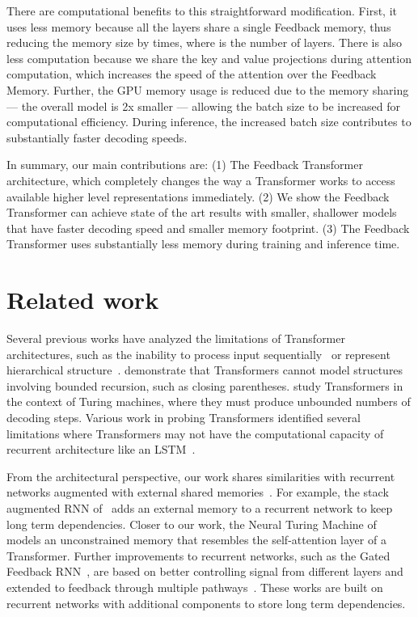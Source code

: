 \documentclass{article} \usepackage{iclr2021_conference}
\begin{document}
There are computational benefits to this straightforward modification. First, it uses less memory because all the layers share a single Feedback memory, thus reducing the memory size by  times, where  is the number of layers. There is also less computation because we share the key and value projections during attention computation, which increases the speed of the attention over the Feedback Memory.
Further, the GPU memory usage is reduced due to the memory sharing --- the overall model is 2x smaller --- allowing the batch size to be increased for computational efficiency. During inference, the increased batch size contributes to substantially faster decoding speeds. 

In summary, our main contributions are: (1) The Feedback Transformer architecture, which completely changes the way a Transformer works to access available higher level representations immediately. (2) We show the Feedback Transformer can achieve state of the art results with smaller, shallower models that have faster decoding speed and smaller memory footprint. (3) The Feedback Transformer uses substantially less memory during training and inference time. 
 \section{Related work}

Several previous works have analyzed the limitations of Transformer architectures, such as the inability to process input sequentially~\citep{dehghani2018universal} or represent hierarchical structure~\citep{tran2018importance}. \citet{hahn2020theoretical} demonstrate that Transformers cannot model structures involving bounded recursion, such as closing parentheses. \citet{perez2019turing} study Transformers in the context of Turing machines, where they must produce unbounded numbers of decoding steps. Various work in probing Transformers identified several limitations where Transformers may not have the computational capacity of recurrent architecture like an LSTM~\citep{hahn2020theoretical}. 

From the architectural perspective, our work shares similarities with recurrent networks augmented with external shared memories~\citep{graves2014neural,joulin2015inferring,sukhbaatar2015end}.
For example, the stack augmented RNN of~\citet{joulin2015inferring} adds an external memory to a recurrent network to keep long term dependencies.
Closer to our work, the Neural Turing Machine of~\citet{graves2014neural} models an unconstrained memory that resembles the self-attention layer of a Transformer.
Further improvements to recurrent networks, such as the Gated Feedback RNN~\citep{chung2015gated}, are based on better controlling signal from different layers and extended to feedback through multiple pathways~\citep{jin2017multi}. 
These works are built on recurrent networks with additional components to store long term dependencies. 
\end{document}
